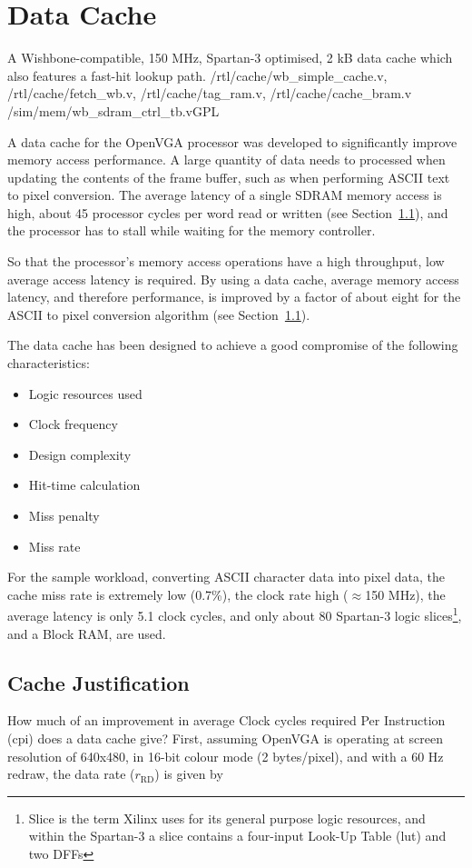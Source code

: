 \section{Data Cache}
\label{MEM_Cache}

{A Wishbone-compatible, 150 MHz, Spartan-3 optimised, 2 kB data cache which also
features a fast-hit lookup path.} {/rtl/cache/wb\_simple\_cache.v,
/rtl/cache/fetch\_wb.v, /rtl/cache/tag\_ram.v, /rtl/cache/cache\_bram.v}
{/sim/mem/wb\_sdram\_ctrl\_tb.v}{GPL}

A data cache for the OpenVGA processor was developed to significantly improve
memory access performance. A large quantity of data needs to processed when
updating the contents of the frame buffer, such as when performing ASCII text to
pixel conversion. The average latency of a single SDRAM memory access is high,
about 45 processor cycles per word read or written (see
Section~\ref{CACHE_Justification}), and the processor has to stall while waiting
for the memory controller.

So that the processor's memory access operations have a high throughput, low
average access latency is required. By using a data cache, average memory access
latency, and therefore performance, is improved by a factor of about eight for
the ASCII to pixel conversion algorithm (see Section~\ref{CACHE_Justification}).

The data cache has been designed to achieve a good compromise of the following
characteristics:
\begin{itemize}
  \item Logic resources used
  \item Clock frequency
  \item Design complexity
  \item Hit-time calculation
  \item Miss penalty
  \item Miss rate
\end{itemize}

For the sample workload, converting ASCII character data into pixel data, the
cache miss rate is extremely low (0.7\%), the clock rate high ($\approx$150
MHz), the average latency is only 5.1 clock cycles, and only about 80 Spartan-3
logic slices\footnote{Slice is the term Xilinx uses for its general purpose logic
resources, and within the Spartan-3 a slice contains a four-input Look-Up
Table (\gls{lut}) and two DFFs}, and
a Block RAM, are used.


\subsection{Cache Justification}
\label{CACHE_Justification}
How much of an improvement in average Clock cycles required Per
Instruction (\gls{cpi}) does
a data cache give? First, assuming OpenVGA is operating at screen resolution of
640x480, in 16-bit colour mode (2 bytes/pixel), and with a 60 Hz redraw, the data
rate ($r_\mathrm{RD}$) is given by


